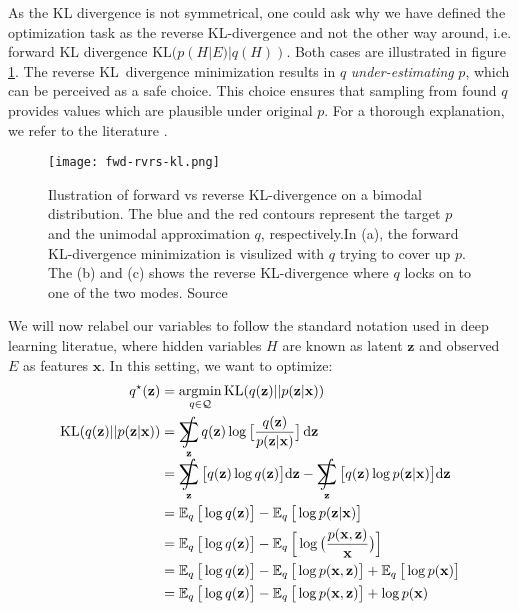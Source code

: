 As the KL divergence is not symmetrical, one could ask why we have defined the optimization task as the reverse KL-divergence and not the other way
around, i.e. forward KL divergence $\mathrm{KL}(p(H | E) | q(H))$. Both cases are illustrated in figure \ref{fig:forward-reverse}. The reverse 
KL~divergence minimization results in $q$ \textit{under-estimating} $p$, which can be perceived as a safe choice. This choice ensures that sampling
from found $q$ provides values which are plausible under original $p$. For a thorough explanation, we refer to the literature 
\cite{another-vb-intro-2021}.
\begin{figure}[t]
    \centering
    \texttt{[image: fwd-rvrs-kl.png]}
    \caption[Forward vs reverse KL divergence]{Ilustration of forward vs reverse KL-divergence on a bimodal distribution. The blue and the red contours represent the target $p$ 
    and the unimodal approximation $q$, respectively.In (a), the forward KL-divergence minimization is visulized with $q$ trying to cover up $p$.
    The (b) and (c) shows the reverse KL-divergence where $q$ locks on to one of the two modes. Source \cite{another-vb-intro-2021}}
    \label{fig:forward-reverse}
\end{figure}
We will now relabel our variables to follow
the standard notation used in deep learning literatue, where hidden variables $H$ are known as latent $\mathbf{z}$ and observed $E$ as features $\mathbf{x}$. 
In this setting, we want to optimize:
\begin{align}
    q^\star(\mathbf{z}) &= \argmin_{q \in \mathcal{Q}} \mathrm{KL}(q(\mathbf{z}) || p(\mathbf{z} | \mathbf{x})) \\
    \mathrm{KL}(q(\mathbf{z}) || p(\mathbf{z} | \mathbf{x})) &= \SumInt_\mathbf{z} q(\mathbf{z}) \log \big[ \frac{q(\mathbf{z})}{p(\mathbf{z}|\mathbf{x})} \big]\,\d \mathbf{z} \\
    &= \SumInt_\mathbf{z} \big[q(\mathbf{z}) \log q(\mathbf{z})\big] \d \mathbf{z} - \SumInt_\mathbf{z}  \big[q(\mathbf{z}) \log p(\mathbf{z}|\mathbf{x})\big] \d \mathbf{z} \\
    &= \EX_q \big[\log q(\mathbf{z})\big] - \EX_q \big[\log p(\mathbf{z}|\mathbf{x})\big] \\
    &= \EX_q \big[\log q(\mathbf{z})\big] - \EX_q \Big[\log \big( \frac{p(\mathbf{x},\mathbf{z})}{\mathbf{x}}\big) \Big] \\
    &= \EX_q \big[\log q(\mathbf{z})\big] - \EX_q \big[\log p(\mathbf{x},\mathbf{z})\big] + \EX_q \big[\log p(\mathbf{x})\big] \\
    &= \EX_q \big[\log q(\mathbf{z})\big] - \EX_q \big[\log p(\mathbf{x},\mathbf{z})\big] + \log p(\mathbf{x})
\end{align}
